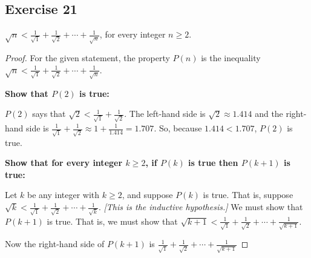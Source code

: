 \documentclass[14pt]{extarticle}
\newcommand{\dps}{\displaystyle}
\begin{document}
\subsection{Exercise 21}
$\dps \sqrt{n} < \frac{1}{\sqrt{1}} + \frac{1}{\sqrt{2}} + \cdots + \frac{1}{\sqrt{n}}$, for every integer $n \geq 2$.

\begin{proof}
    For the given statement, the property $P(n)$ is the inequality $\dps \sqrt{n} < \frac{1}{\sqrt{1}} + \frac{1}{\sqrt{2}} + \cdots + \frac{1}{\sqrt{n}}$.

        {\bf Show that $P(2)$ is true:}

    $P(2)$ says that $\dps \sqrt{2} < \frac{1}{\sqrt{1}} + \frac{1}{\sqrt{2}}$. The left-hand side is $\dps \sqrt{2} \approx 1.414$ and the right-hand side is $\dps \frac{1}{\sqrt{1}} + \frac{1}{\sqrt{2}} \approx 1 + \frac{1}{1.414} = 1.707$. So, because $1.414 < 1.707$, $P(2)$ is true.

        {\bf Show that for every integer $k \geq 2$, if $P(k)$ is true then $P(k + 1)$ is true:}

    Let $k$ be any integer with $k \geq 2$, and suppose $P(k)$ is true. That is, suppose $\dps \sqrt{k} < \frac{1}{\sqrt{1}} + \frac{1}{\sqrt{2}} + \cdots + \frac{1}{\sqrt{k}}$. {\it [This is the inductive hypothesis.]} We must show that $P(k + 1)$ is true. That is, we must show that $\dps \sqrt{k+1} < \frac{1}{\sqrt{1}} + \frac{1}{\sqrt{2}} + \cdots + \frac{1}{\sqrt{k+1}}$.

    Now the right-hand side of $P(k+1)$ is $\dps \frac{1}{\sqrt{1}} + \frac{1}{\sqrt{2}} + \cdots + \frac{1}{\sqrt{k+1}}$


\end{proof}
\end{document}
